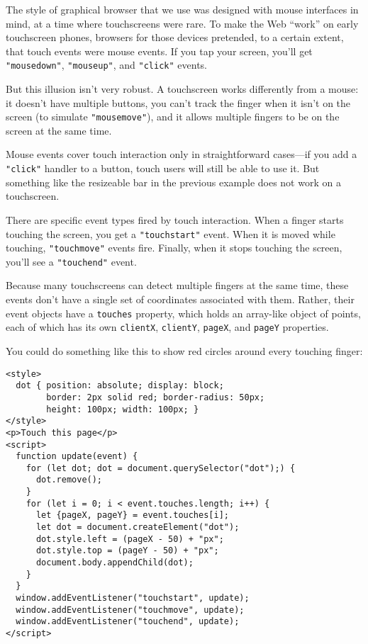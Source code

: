The style of graphical browser that we use was designed with mouse interfaces in mind, at a time where touchscreens were rare. To make the Web ``work'' on early touchscreen phones, browsers for those devices pretended, to a certain extent, that touch events were mouse events. If you tap your screen, you'll get \lstinline`"mousedown"`, \lstinline`"mouseup"`, and \lstinline`"click"` events.

But this illusion isn't very robust. A touchscreen works differently from a mouse: it doesn't have multiple buttons, you can't track the finger when it isn't on the screen (to simulate \lstinline`"mousemove"`), and it allows multiple fingers to be on the screen at the same time.

Mouse events cover touch interaction only in straightforward cases—if you add a \lstinline`"click"` handler to a button, touch users will still be able to use it. But something like the resizeable bar in the previous example does not work on a touchscreen.

There are specific event types fired by touch interaction. When a finger starts touching the screen, you get a \lstinline`"touchstart"` event. When it is moved while touching, \lstinline`"touchmove"` events fire. Finally, when it stops touching the screen, you'll see a \lstinline`"touchend"` event.

Because many touchscreens can detect multiple fingers at the same time, these events don't have a single set of coordinates associated with them. Rather, their event objects have a \lstinline`touches` property, which holds an array-like object of points, each of which has its own \lstinline`clientX`, \lstinline`clientY`, \lstinline`pageX`, and \lstinline`pageY` properties.

You could do something like this to show red circles around every touching finger:

\begin{lstlisting}
<style>
  dot { position: absolute; display: block;
        border: 2px solid red; border-radius: 50px;
        height: 100px; width: 100px; }
</style>
<p>Touch this page</p>
<script>
  function update(event) {
    for (let dot; dot = document.querySelector("dot");) {
      dot.remove();
    }
    for (let i = 0; i < event.touches.length; i++) {
      let {pageX, pageY} = event.touches[i];
      let dot = document.createElement("dot");
      dot.style.left = (pageX - 50) + "px";
      dot.style.top = (pageY - 50) + "px";
      document.body.appendChild(dot);
    }
  }
  window.addEventListener("touchstart", update);
  window.addEventListener("touchmove", update);
  window.addEventListener("touchend", update);
</script>
\end{lstlisting}
\noindent{}

